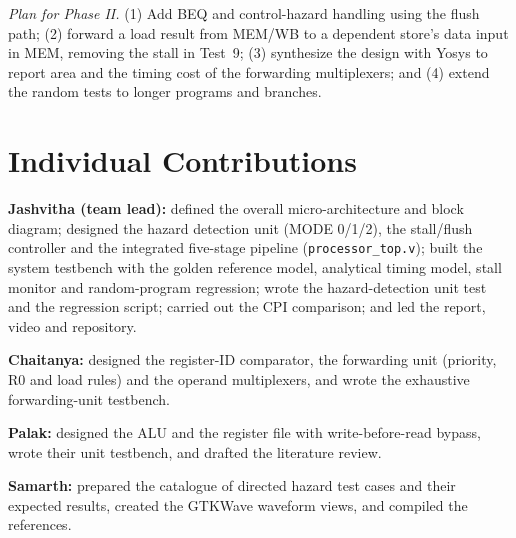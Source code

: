\documentclass[conference]{IEEEtran}
\begin{document}
\textit{Plan for Phase II.} (1) Add BEQ and control-hazard handling using the flush path; (2) forward a load result from MEM/WB to a dependent store's data input in MEM, removing the stall in Test~9; (3) synthesize the design with Yosys to report area and the timing cost of the forwarding multiplexers; and (4) extend the random tests to longer programs and branches.

\section{Individual Contributions}
\textbf{Jashvitha (team lead):} defined the overall micro-architecture and block diagram; designed the hazard detection unit (MODE 0/1/2), the stall/flush controller and the integrated five-stage pipeline (\texttt{processor\_top.v}); built the system testbench with the golden reference model, analytical timing model, stall monitor and random-program regression; wrote the hazard-detection unit test and the regression script; carried out the CPI comparison; and led the report, video and repository.

\textbf{Chaitanya:} designed the register-ID comparator, the forwarding unit (priority, R0 and load rules) and the operand multiplexers, and wrote the exhaustive forwarding-unit testbench.

\textbf{Palak:} designed the ALU and the register file with write-before-read bypass, wrote their unit testbench, and drafted the literature review.

\textbf{Samarth:} prepared the catalogue of directed hazard test cases and their expected results, created the GTKWave waveform views, and compiled the references.
\end{document}

